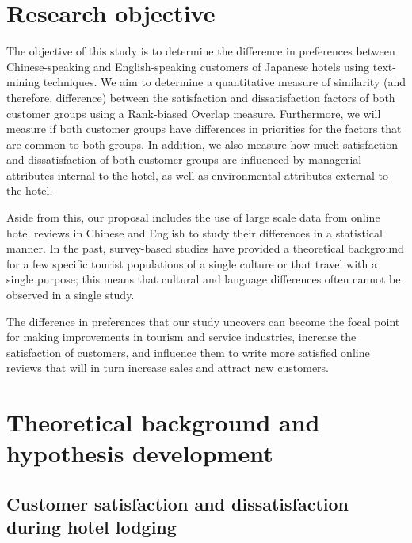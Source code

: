 \section{Research objective}\label{research_objective}

The objective of this study is to determine the difference in preferences between Chinese-speaking and English-speaking customers of Japanese hotels using text-mining techniques. We aim to determine a quantitative measure of similarity (and therefore, difference) between the satisfaction and dissatisfaction factors of both customer groups using a Rank-biased Overlap measure. Furthermore, we will measure if both customer groups have differences in priorities for the factors that are common to both groups. In addition, we also measure how much satisfaction and dissatisfaction of both customer groups are influenced by managerial attributes internal to the hotel, as well as environmental attributes external to the hotel. 

Aside from this, our proposal includes the use of large scale data from online hotel reviews in Chinese and English to study their differences in a statistical manner. In the past, survey-based studies have provided a theoretical background for a few specific tourist populations of a single culture or that travel with a single purpose; this means that cultural and language differences often cannot be observed in a single study. 

The difference in preferences that our study uncovers can become the focal point for making improvements in tourism and service industries, increase the satisfaction of customers, and influence them to write more satisfied online reviews that will in turn increase sales and attract new customers. 

\section{Theoretical background and hypothesis development}\label{theory_hypothesis}

\subsection{Customer satisfaction and dissatisfaction during hotel lodging}\label{theory_satisfaction}

